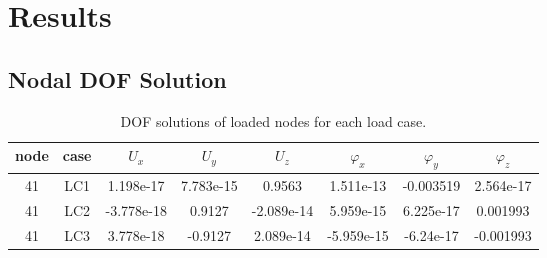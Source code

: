 \documentclass{article}%
\begin{document}
%
\section{Results}%
\label{sec:Results}%

%
\subsection{Nodal DOF Solution}%
\label{subsec:NodalDOFSolution}%
\begin{table}[h!]\centering%
\begin{tabular}{| c c | c c c c c c |}%
\hline%
node&case&$U_x$&$U_y$&$U_z$&$\varphi_x$&$\varphi_y$&$\varphi_z$\\%
\hline%
\hline%
41&LC1&1.198e{-}17&7.783e{-}15&0.9563&1.511e{-}13&{-}0.003519&2.564e{-}17\\%
41&LC2&{-}3.778e{-}18&0.9127&{-}2.089e{-}14&5.959e{-}15&6.225e{-}17&0.001993\\%
41&LC3&3.778e{-}18&{-}0.9127&2.089e{-}14&{-}5.959e{-}15&{-}6.24e{-}17&{-}0.001993\\%
\hline%
\end{tabular}%
\caption{DOF solutions of loaded nodes for each load case.}\label{table:tbl-dofsol}\end{table}%
\end{document}
